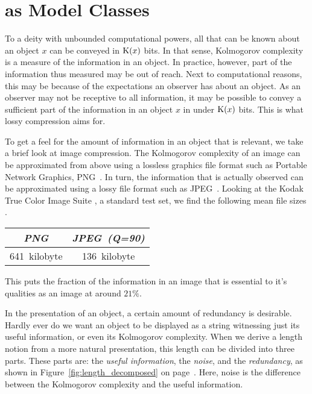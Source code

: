 \section{as Model Classes}

To a deity with unbounded computational powers, all that can be known about an object $x$ can be conveyed in $\operatorname{K}(x)$ bits.
In that sense, Kolmogorov complexity is a measure of the information in an object.
In practice, however, part of the information thus measured may be out of reach.
Next to computational reasons, this may be because of the expectations an observer has about an object.
As an observer may not be receptive to all information, it may be possible to convey a sufficient part of the information in an object $x$ in under $\operatorname{K}(x)$ bits.
This is what lossy compression aims for.

\begin{example}
\label{ex:useful_information}%
  To get a feel for the amount of information in an object that is relevant, we take a brief look at image compression.
  The Kolmogorov complexity of an image can be approximated from above using a lossless graphics file format such as Portable Network Graphics, PNG~\parencite{sayood2017introduction}.
  In turn, the information that is actually observed can be approximated using a lossy file format such as JPEG~\parencite{sayood2017introduction}.
  Looking at the Kodak True Color Image Suite \parencite{franzen1999kodak}, a standard test set, we find the following mean file sizes \parencite{sneyers2016flif}.
  \begin{center}
    \begin{tabular}{cc}
    \emph{PNG}	& \emph{JPEG~(Q=90)} \\
    \hline
    641~kilobyte	& 136~kilobyte
    \end{tabular}
  \end{center}
  This puts the fraction of the information in an image that is essential to it's qualities as an image at around $21\%$.
\end{example}

In the presentation of an object, a certain amount of redundancy is desirable.
Hardly ever do we want an object to be displayed as a string witnessing just its useful information, or even its Kolmogorov complexity.
When we derive a length notion from a more natural presentation, this length can be divided into three parts.
These parts are: the \emph{useful information}, the \emph{noise}, and the \emph{redundancy}, as shown in Figure~\ref{fig:length_decomposed} on page~\pageref{fig:length_decomposed}.
Here, noise is the difference between the Kolmogorov complexity and the useful information.

